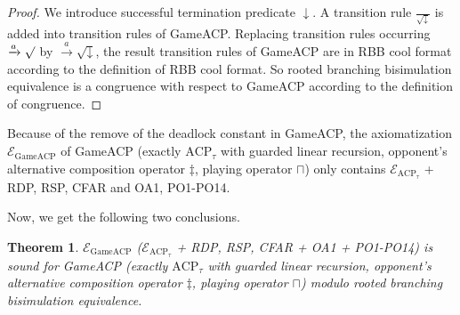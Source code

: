 \documentclass{fac}
\newtheorem{theorem}{Theorem}[section]
\begin{document}
\begin{proof}
We introduce successful termination predicate $\downarrow$. A transition rule $\frac{}{\surd\downarrow}$ is added into transition rules of GameACP. Replacing transition rules occurring $\xrightarrow{a}\surd$ by $\xrightarrow{a}\surd\downarrow$, the result transition rules of GameACP are in RBB cool format according to the definition of RBB cool format. So rooted branching bisimulation equivalence is a congruence with respect to GameACP according to the definition of congruence.
\end{proof}

Because of the remove of the deadlock constant in GameACP, the axiomatization $\mathcal{E}_{\textrm{GameACP}}$ of GameACP (exactly $\textrm{ACP}_\tau$ with guarded linear recursion, opponent's alternative composition operator $\ddagger$, playing operator $\sqcap$) only contains $\mathcal{E}_{\textrm{ACP}_\tau}$ + RDP, RSP, CFAR and OA1, PO1-PO14.

Now, we get the following two conclusions.

\begin{theorem}
$\mathcal{E}_{\textrm{GameACP}}$ ($\mathcal{E}_{\textrm{ACP}_\tau}$ + RDP, RSP, CFAR + OA1 + PO1-PO14) is sound for GameACP (exactly $\textrm{ACP}_\tau$ with guarded linear recursion, opponent's alternative composition operator $\ddagger$, playing operator $\sqcap$) modulo rooted branching bisimulation equivalence.
\end{theorem}
\end{document}
